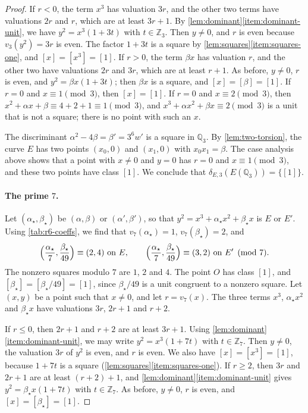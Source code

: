 \documentclass[12pt,oneside,openany]{book}
\theoremstyle{definition}
\theoremstyle{plain}
\numberwithin{equation}{chapter}
\theoremstyle{plain}
\theoremstyle{definition}
\theoremstyle{remark}
\newcommand{\Q}{\mathbb Q}
\newcommand{\Z}{\mathbb Z}
\newcommand{\sq}[1]{[#1]}
\begin{document}
\begin{proof}
If $r<0$, the term $x^3$ has valuation $3r$, and the other two terms have valuations $2r$ and $r$, which are at least $3r+1$. By \cref{lem:dominant}\ref{item:dominant-unit}, we have $y^2=x^3(1+3t)$ with $t\in\Z_3$. Then $y\ne0$, and $r$ is even because $v_3(y^2)=3r$ is even. The factor $1+3t$ is a square by \cref{lem:squares}\ref{item:squares-one}, and $\sq x=\sq{x^3}=\sq1$. If $r>0$, the term $\beta x$ has valuation $r$, and the other two have valuations $2r$ and $3r$, which are at least $r+1$. As before, $y\ne0$, $r$ is even, and $y^2=\beta x(1+3t)$; then $\beta x$ is a square, and $\sq x=\sq\beta=\sq1$. If $r=0$ and $x\equiv1\pmod 3$, then $\sq x=\sq1$. If $r=0$ and $x\equiv2\pmod3$, then $x^2+\alpha x+\beta\equiv4+2+1\equiv1\pmod 3$, and $x^3+\alpha x^2+\beta x\equiv2\pmod3$ is a unit that is not a square; there is no point with such an $x$.

The discriminant $\alpha^2-4\beta=\beta'=3^6w'$ is a square in $\Q_3$. By \cref{lem:two-torsion}, the curve $E$ has two points $(x_0,0)$ and $(x_1,0)$ with $x_0x_1=\beta$. The case analysis above shows that a point with $x\ne0$ and $y=0$ has $r=0$ and $x\equiv1\pmod3$, and these two points have class $\sq1$. We conclude that $\delta_{E,3}(E(\Q_3))=\{\sq1\}$.

\paragraph{The prime $7$.} Let $(\alpha_\star,\beta_\star)$ be $(\alpha,\beta)$ or $(\alpha',\beta')$, so that $y^2=x^3+\alpha_\star x^2+\beta_\star x$ is $E$ or $E'$. Using \cref{tab:r6-coeffs}, we find that $v_7(\alpha_\star)=1$, $v_7(\beta_\star)=2$, and
\[
\Bigl(\frac{\alpha_\star}{7},\frac{\beta_\star}{49}\Bigr)\equiv(2,4)\ \text{on } E,\qquad \Bigl(\frac{\alpha_\star}{7},\frac{\beta_\star}{49}\Bigr)\equiv(3,2)\ \text{on } E' \pmod 7.
\]
The nonzero squares modulo $7$ are $1$, $2$ and $4$. The point $O$ has class $\sq1$, and $\sq{\beta_\star}=\sq{\beta_\star/49}=\sq1$, since $\beta_\star/49$ is a unit congruent to a nonzero square. Let $(x,y)$ be a point such that $x\ne0$, and let $r=v_7(x)$. The three terms $x^3$, $\alpha_\star x^2$ and $\beta_\star x$ have valuations $3r$, $2r+1$ and $r+2$.

If $r\le0$, then $2r+1$ and $r+2$ are at least $3r+1$. Using \cref{lem:dominant}\ref{item:dominant-unit}, we may write $y^2=x^3(1+7t)$ with $t\in\Z_7$. Then $y\ne0$, the valuation $3r$ of $y^2$ is even, and $r$ is even. We also have $\sq x=\sq{x^3}=\sq1$, because $1+7t$ is a square (\cref{lem:squares}\ref{item:squares-one}). If $r\ge2$, then $3r$ and $2r+1$ are at least $(r+2)+1$, and \cref{lem:dominant}\ref{item:dominant-unit} gives $y^2=\beta_\star x(1+7t)$ with $t\in\Z_7$. As before, $y\ne0$, $r$ is even, and $\sq x=\sq{\beta_\star}=\sq1$.


\end{proof}
\end{document}
